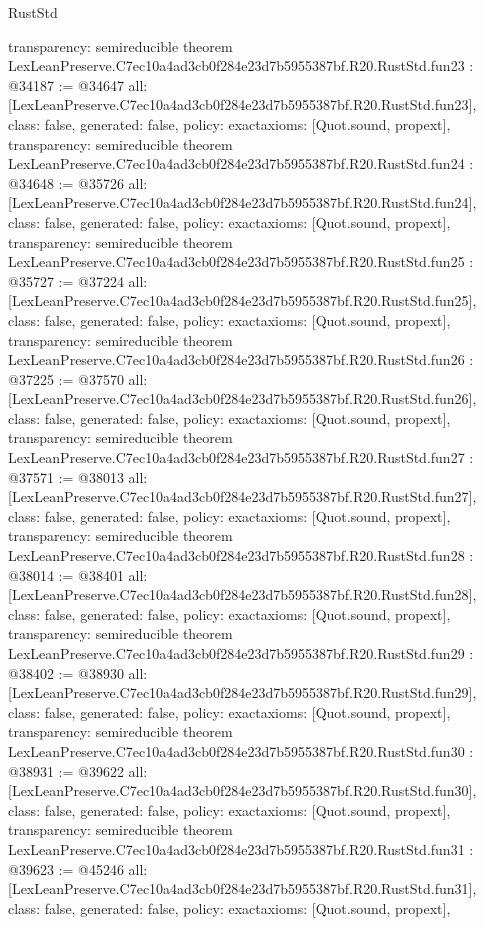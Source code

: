 \begin{lexlean}{RustStd}
\begin{coremodule}
{  transparency: semireducible
}
theorem LexLeanPreserve.C7ec10a4ad3cb0f284e23d7b5955387bf.R20.RustStd.fun23 : @34187 := @34647 {
  all: [LexLeanPreserve.C7ec10a4ad3cb0f284e23d7b5955387bf.R20.RustStd.fun23],
  class: false,
  generated: false,
  policy: exact{axioms: [Quot.sound, propext]},
  transparency: semireducible
}
theorem LexLeanPreserve.C7ec10a4ad3cb0f284e23d7b5955387bf.R20.RustStd.fun24 : @34648 := @35726 {
  all: [LexLeanPreserve.C7ec10a4ad3cb0f284e23d7b5955387bf.R20.RustStd.fun24],
  class: false,
  generated: false,
  policy: exact{axioms: [Quot.sound, propext]},
  transparency: semireducible
}
theorem LexLeanPreserve.C7ec10a4ad3cb0f284e23d7b5955387bf.R20.RustStd.fun25 : @35727 := @37224 {
  all: [LexLeanPreserve.C7ec10a4ad3cb0f284e23d7b5955387bf.R20.RustStd.fun25],
  class: false,
  generated: false,
  policy: exact{axioms: [Quot.sound, propext]},
  transparency: semireducible
}
theorem LexLeanPreserve.C7ec10a4ad3cb0f284e23d7b5955387bf.R20.RustStd.fun26 : @37225 := @37570 {
  all: [LexLeanPreserve.C7ec10a4ad3cb0f284e23d7b5955387bf.R20.RustStd.fun26],
  class: false,
  generated: false,
  policy: exact{axioms: [Quot.sound, propext]},
  transparency: semireducible
}
theorem LexLeanPreserve.C7ec10a4ad3cb0f284e23d7b5955387bf.R20.RustStd.fun27 : @37571 := @38013 {
  all: [LexLeanPreserve.C7ec10a4ad3cb0f284e23d7b5955387bf.R20.RustStd.fun27],
  class: false,
  generated: false,
  policy: exact{axioms: [Quot.sound, propext]},
  transparency: semireducible
}
theorem LexLeanPreserve.C7ec10a4ad3cb0f284e23d7b5955387bf.R20.RustStd.fun28 : @38014 := @38401 {
  all: [LexLeanPreserve.C7ec10a4ad3cb0f284e23d7b5955387bf.R20.RustStd.fun28],
  class: false,
  generated: false,
  policy: exact{axioms: [Quot.sound, propext]},
  transparency: semireducible
}
theorem LexLeanPreserve.C7ec10a4ad3cb0f284e23d7b5955387bf.R20.RustStd.fun29 : @38402 := @38930 {
  all: [LexLeanPreserve.C7ec10a4ad3cb0f284e23d7b5955387bf.R20.RustStd.fun29],
  class: false,
  generated: false,
  policy: exact{axioms: [Quot.sound, propext]},
  transparency: semireducible
}
theorem LexLeanPreserve.C7ec10a4ad3cb0f284e23d7b5955387bf.R20.RustStd.fun30 : @38931 := @39622 {
  all: [LexLeanPreserve.C7ec10a4ad3cb0f284e23d7b5955387bf.R20.RustStd.fun30],
  class: false,
  generated: false,
  policy: exact{axioms: [Quot.sound, propext]},
  transparency: semireducible
}
theorem LexLeanPreserve.C7ec10a4ad3cb0f284e23d7b5955387bf.R20.RustStd.fun31 : @39623 := @45246 {
  all: [LexLeanPreserve.C7ec10a4ad3cb0f284e23d7b5955387bf.R20.RustStd.fun31],
  class: false,
  generated: false,
  policy: exact{axioms: [Quot.sound, propext]},
}
\end{coremodule}
\end{lexlean}
